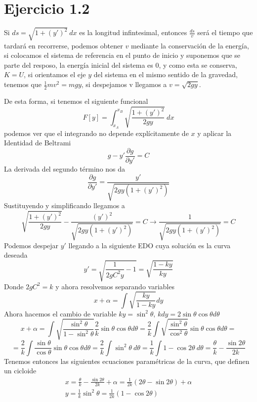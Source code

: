 \section{Ejercicio 1.2}


Si $ds=\sqrt{1+(y')^2} \ dx$ es la longitud infintesimal, entonces $\frac{ds}{v}$ será el tiempo que tardará en recorrerse, podemos obtener $v$ mediante la conservación de la energía, si colocamos el sistema de referencia en el punto de inicio y suponemos que se parte del resposo, la energía inicial del sistema es 0, y como esta se conserva, $K=U$, si orientamos el eje $y$ del sistema en el mismo sentido de la gravedad, tenemos que $\frac{1}{2}m v^2 = mgy$, si despejamos v llegamos a $v = \sqrt{2gy}$.

De esta forma, si tenemos el siguiente funcional
\[ F[y] = \int_{x_A}^{x_B}{\sqrt{\frac{1+(y')^2}{2gy}} \ dx}\]
podemos ver que el integrando no depende explícitamente de $x$ y aplicar la Identidad de Beltrami
\[g - y' \frac{\partial g}{\partial y'}= C\]
La derivada del segundo término nos da
\[\frac{\partial g}{\partial y'} = \frac{y'}{\sqrt{2gy(1+(y')^2)}}\]
Sustituyendo y simplificando llegamos a 
\[\sqrt{\frac{1+(y')^2}{2gy}} - \frac{(y')^2}{\sqrt{2gy(1+(y')^2)}}= C \rightarrow \frac{1}{\sqrt{2gy(1+(y')^2)}}=C\]
Podemos despejar $y'$ llegando a la siguiente EDO cuya solución es la curva deseada
\[y' = \sqrt{\frac{1}{2gC^2 y}-1} = \sqrt{\frac{1-ky}{k y}}\]
Donde $2gC^2=k$ y ahora resolvemos separando variables
\[x+\alpha = \int{\sqrt{\frac{ky}{1-k y}}dy}\]
Ahora hacemos el cambio de variable $ky=\sin^2{\theta}$, $kdy=2\sin{\theta}\cos{\theta}d\theta$
\[x+\alpha = \int{\sqrt{\frac{\sin^2{\theta}}{1-\sin^2{\theta}}}\frac{2}{k}\sin{\theta}\cos{\theta}d\theta}=\frac{2}{k}\int{\sqrt{\frac{\sin^2{\theta}}{\cos^2{\theta}}}\sin{\theta}\cos{\theta}d\theta}=\]
\[=\frac{2}{k}\int{\frac{\sin{\theta}}{\cos{\theta}}\sin{\theta}\cos{\theta}d\theta}=\frac{2}{k}\int{\sin^2{\theta} \ d\theta}=\frac{1}{k}\int{1-\cos{2\theta} \ d\theta}=\frac{\theta}{k}-\frac{\sin{2\theta}}{2k}\]
Tenemos entonces las siguientes ecuaciones paramétricas de la curva, que definen un cicloide
\[\begin{matrix}
    x= \frac{\theta}{k}-\frac{\sin{2\theta}}{2k} + \alpha = \frac{1}{2k}(2\theta - \sin{2\theta})+\alpha \\
    y = \frac{1}{k} \sin^2{\theta}=\frac{1}{2k}(1-\cos{2\theta})
\end{matrix}\]